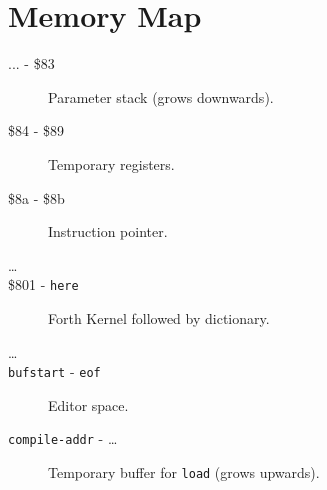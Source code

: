 \chapter{Memory Map}

\begin{description}
\item[... - \$83] Parameter stack (grows downwards).
\item[\$84 - \$89] Temporary registers.
\item[\$8a - \$8b] Instruction pointer.
\item[\ldots]
\item[\$801 - \texttt{here}] Forth Kernel followed by dictionary.
\item[\ldots]
\item[\texttt{bufstart} - \texttt{eof}] Editor space.
\item[\texttt{compile-addr} - \ldots] Temporary buffer for \texttt{load} (grows upwards).
\end{description}

